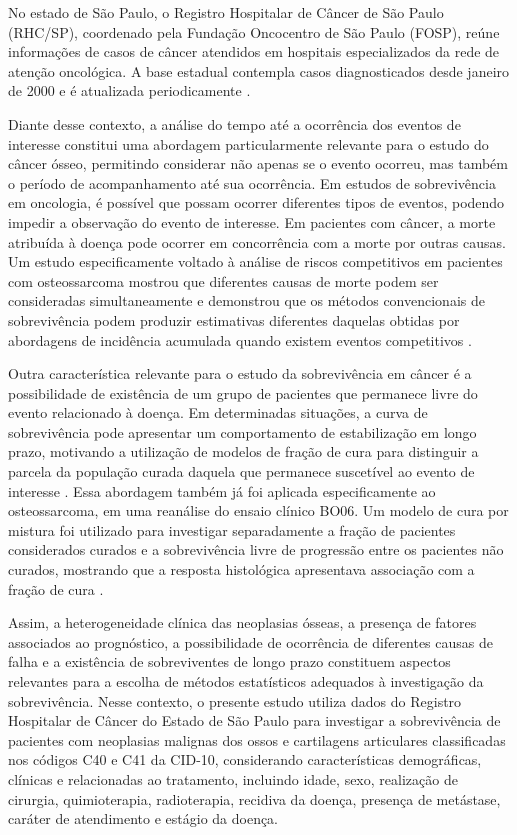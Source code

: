 \documentclass[11pt,a4paper]{article}
\begin{document}
No estado de São Paulo, o Registro Hospitalar de Câncer de São Paulo (RHC/SP), coordenado pela Fundação Oncocentro de São Paulo (FOSP), reúne informações de casos de câncer atendidos em hospitais especializados da rede de atenção oncológica. A base estadual contempla casos diagnosticados desde janeiro de 2000 e é atualizada periodicamente \citep{FOSP2026}.

Diante desse contexto, a análise do tempo até a ocorrência dos eventos de interesse constitui uma abordagem particularmente relevante para o estudo do câncer ósseo, permitindo considerar não apenas se o evento ocorreu, mas também o período de acompanhamento até sua ocorrência. Em estudos de sobrevivência em oncologia, é possível que possam ocorrer diferentes tipos de eventos, podendo impedir a observação do evento de interesse. Em pacientes com câncer, a morte atribuída à doença pode ocorrer em concorrência com a morte por outras causas. Um estudo especificamente voltado à análise de riscos competitivos em pacientes com osteossarcoma mostrou que diferentes causas de morte podem ser consideradas simultaneamente e demonstrou que os métodos convencionais de sobrevivência podem produzir estimativas diferentes daquelas obtidas por abordagens de incidência acumulada quando existem eventos competitivos \citep{tai2001competing}. 

Outra característica relevante para o estudo da sobrevivência em câncer é a possibilidade de existência de um grupo de pacientes que permanece livre do evento relacionado à doença. Em determinadas situações, a curva de sobrevivência pode apresentar um comportamento de estabilização em longo prazo, motivando a utilização de modelos de fração de cura para distinguir a parcela da população curada daquela que permanece suscetível ao evento de interesse \citep{felizzi2021mixture}. Essa abordagem também já foi aplicada especificamente ao osteossarcoma, em uma reanálise do ensaio clínico BO06. Um modelo de cura por mistura foi utilizado para investigar separadamente a fração de pacientes considerados curados e a sobrevivência livre de progressão entre os pacientes não curados, mostrando que a resposta histológica apresentava associação com a fração de cura \citep{musta2022short}. 

Assim, a heterogeneidade clínica das neoplasias ósseas, a presença de fatores associados ao prognóstico, a possibilidade de ocorrência de diferentes causas de falha e a existência de sobreviventes de longo prazo constituem aspectos relevantes para a escolha de métodos estatísticos adequados à investigação da sobrevivência. Nesse contexto, o presente estudo utiliza dados do Registro Hospitalar de Câncer do Estado de São Paulo para investigar a sobrevivência de pacientes com neoplasias malignas dos ossos e cartilagens articulares classificadas nos códigos C40 e C41 da CID-10, considerando características demográficas, clínicas e relacionadas ao tratamento, incluindo idade, sexo, realização de cirurgia, quimioterapia, radioterapia, recidiva da doença, presença de metástase, caráter de atendimento e estágio da doença.
\end{document}

